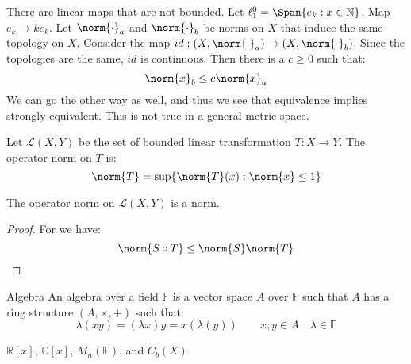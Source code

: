 \documentclass[crop=false,class=article,oneside]{standalone}
\begin{document}
        There are linear maps that are not bounded. Let
        $\ell_{1}^{0}=\Span\{e_{k}:x\in\mathbb{N}\}$. Map
        $e_{k}\rightarrow{k}e_{k}$. Let
        $\norm{\cdot}_{a}$ and $\norm{\cdot}_{b}$ be norms on
        $X$ that induce the same topology on $X$. Consider the map
        $id:(X,\norm{\cdot}_{a})\rightarrow(X,\norm{\cdot}_{b})$.
        Since the topologies are the same, $id$ is continuous.
        Then there is a $c\geq{0}$ such that:
        \begin{equation}
            \norm{x}_{b}\leq{c}\norm{x}_{a}
        \end{equation}
        We can go the other way as well, and thus we see that
        equivalence implies strongly equivalent. This is not true
        in a general metric space.
        \begin{ldefinition}{}
            Let $\mathscr{L}(X,Y)$ be the set of bounded linear
            transformation $T:X\rightarrow{Y}$. The operator
            norm on $T$ is:
            \begin{equation}
                \norm{T}=\sup\{\norm{T}(x):\norm{x}\leq{1}\}
            \end{equation}
        \end{ldefinition}
        \begin{theorem}
            The operator norm on $\mathscr{L}(X,Y)$ is a norm.
        \end{theorem}
        \begin{proof}
            For we have:
            \begin{equation}
                \norm{S\circ{T}}\leq\norm{S}\norm{T}
            \end{equation}
        \end{proof}
        \begin{ldefinition}{Algebra}
            An algebra over a field $\mathbb{F}$ is a vector
            space $A$ over $\mathbb{F}$ such that $A$ has a ring
            structure $(A,\times,+)$ such that:
            \begin{equation}
                \lambda(xy)=(\lambda{x})y
                =x(\lambda(y))
                \quad\quad
                x,y\in{A}
                \quad\lambda\in\mathbb{F}
            \end{equation}
        \end{ldefinition}
        \begin{lexample}
            $\mathbb{R}[x]$, $\mathbb{C}[x]$, $M_{n}(\mathbb{F})$,
            and $C_{b}(X)$.
        \end{lexample}
\end{document}
